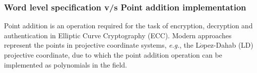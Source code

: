 
\subsubsection{Word level specification v/s Point addition implementation}
Point addition is an operation required for the task of encryption, decryption 
and authentication in Elliptic Curve Cryptography (ECC). 
Modern approaches represent the points in projective
coordinate systems, {\it e.g.}, the L$\acute{o}$pez-Dahab (LD) projective coordinate, due to which the point addition 
operation can be implemented as polynomials in the field.

